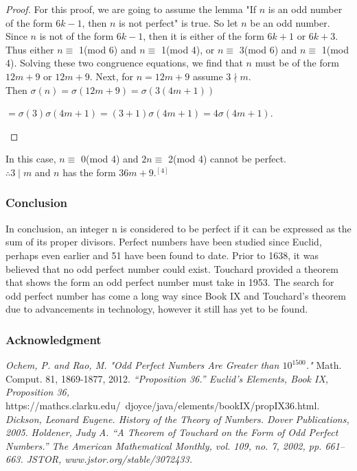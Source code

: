 \documentclass[12pt]{beamer}
\begin{document}
\begin{frame}
\begin{proof}
For this proof, we are going to assume the lemma "If $n$ is an odd number of the form $6k-1$, then $n$ is not perfect" is true.  So let $n$ be an odd number. Since $n$ is not of the form $6k-1$, then it is either of the form $6k+1$ or $6k+3$. Thus either $n \equiv$ 1(mod 6) and $n \equiv$ 1(mod 4), or $n \equiv$ 3(mod 6) and $n \equiv$ 1(mod 4). Solving these two congruence equations, we find that $n$ must be of the form $12m+9$ or $12m+9$. Next, for $n=12m+9$ assume $3 \nmid m$. \\
Then $\sigma (n) = \sigma (12m+9) = \sigma (3(4m+1))$ 
\begin{flushright}
$=\sigma (3) \sigma (4m+1) =(3+1) \sigma (4m+1) = 4\sigma(4m+1)$. 
\end{flushright}
\end{proof}	
\end{frame}
\begin{frame}
In this case, $n \equiv$ 0(mod 4) and $2n \equiv$ 2(mod 4) cannot be perfect. \\
$\therefore 3 \mid m$ and $n$ has the form $36m+9$.$^{[4]}$ 
\end{frame}




\begin{frame}
\frametitle{Conclusion}
In conclusion, an integer n is considered to be perfect if it can be expressed as the sum of its proper divisors. Perfect numbers have been studied since Euclid, perhaps even earlier and 51 have been found to date. Prior to 1638, it was believed that no odd perfect number could exist. Touchard provided a theorem that shows the form an odd perfect number must take in 1953. The search for odd perfect number has come a long way since Book IX and Touchard’s theorem due to advancements in technology, however it still has yet to be found.
\end{frame}

\begin{frame}
\frametitle{Acknowledgment}


\begin{thebibliography}{5}
\textit{Ochem, P. and Rao, M. "Odd Perfect Numbers Are Greater than $10^{1500}$."} Math. Comput. 81, 1869-1877, 2012.
\textit{“Proposition 36.” Euclid's Elements, Book IX, Proposition 36,} https://mathcs.clarku.edu/~djoyce/java/elements/bookIX/propIX36.html.
\textit{Dickson, Leonard Eugene. History of the Theory of Numbers. Dover Publications, 2005.}
\textit{Holdener, Judy A. “A Theorem of Touchard on the Form of Odd Perfect Numbers.” The American Mathematical Monthly, vol. 109, no. 7, 2002, pp. 661–663. JSTOR, www.jstor.org/stable/3072433.}
\end{thebibliography}

\end{frame}
\end{document}
